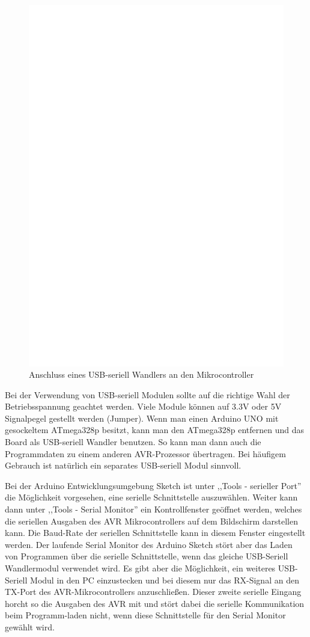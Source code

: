 \begin{figure}[H]
\centering
\includegraphics[width=12cm]{../FIG/UM232.eps}
\caption{Anschluss eines USB-seriell Wandlers an den Mikrocontroller}
\label{fig:UM232}
\end{figure}

Bei der Verwendung von USB-seriell Modulen sollte auf die richtige Wahl der Betriebsspannung
geachtet werden. Viele Module können auf 3.3V oder 5V Signalpegel gestellt werden (Jumper).
Wenn man einen Arduino UNO mit gesockeltem ATmega328p besitzt, kann man den ATmega328p 
entfernen und das Board als USB-seriell Wandler benutzen. 
So kann man dann auch die Programmdaten zu einem anderen AVR-Prozessor übertragen.
Bei häufigem Gebrauch ist natürlich ein separates USB-seriell Modul sinnvoll.

Bei der Arduino Entwicklungsumgebung Sketch ist unter ,,Tools - serieller Port'' die Möglichkeit vorgesehen,
eine serielle Schnittstelle auszuwählen. Weiter kann dann unter ,,Tools - Serial Monitor'' ein Kontrollfenster
geöffnet werden, welches die seriellen Ausgaben des AVR Mikrocontrollers auf dem Bildschirm darstellen
kann. Die Baud-Rate der seriellen Schnittstelle kann in diesem Fenster eingestellt werden.
Der laufende Serial Monitor des Arduino Sketch stört aber das Laden von Programmen über die serielle
Schnittstelle, wenn das gleiche USB-Seriell Wandlermodul verwendet wird.
Es gibt aber die Möglichkeit, ein weiteres USB-Seriell Modul in den PC einzustecken und bei diesem
nur das RX-Signal an den TX-Port des AVR-Mikrocontrollers anzuschließen.
Dieser zweite serielle Eingang horcht so die Ausgaben des AVR mit und stört dabei die serielle 
Kommunikation beim Programm-laden nicht, wenn diese Schnittstelle für den Serial Monitor gewählt wird.

